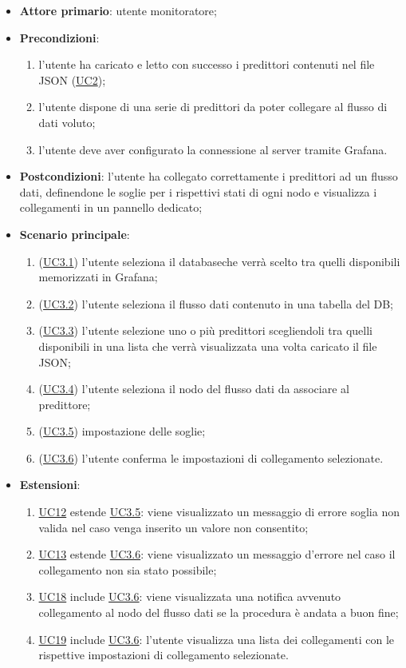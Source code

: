 		\begin{itemize}
			\item\textbf{Attore primario}: utente monitoratore;
			\item\textbf{Precondizioni}:
				\begin{enumerate}
					\item l’utente ha caricato e letto con successo i predittori contenuti nel file JSON (\hyperref[par:UC2]{UC2});
					\item l’utente dispone di una serie di predittori da poter collegare al flusso di dati voluto;
					\item l’utente deve aver configurato la connessione al server tramite Grafana.	
				\end{enumerate}
			\item\textbf{Postcondizioni}: l’utente ha collegato correttamente i predittori ad un flusso dati, definendone le soglie per i rispettivi stati di ogni nodo e visualizza i collegamenti in un pannello dedicato;
			\item\textbf{Scenario principale}:
				\begin{enumerate}
					\item (\hyperref[par:UC3.1]{UC3.1}) l’utente seleziona il database\glo che verrà scelto tra quelli disponibili memorizzati in Grafana;
					\item (\hyperref[par:UC3.2]{UC3.2}) l’utente seleziona il flusso dati contenuto in una tabella del DB;
					\item (\hyperref[par:UC3.3]{UC3.3}) l'utente selezione uno o più predittori scegliendoli tra quelli disponibili in una lista che verrà visualizzata una volta caricato il file JSON;
					\item (\hyperref[par:UC3.4]{UC3.4}) l'utente seleziona il nodo del flusso dati da associare al predittore;
					\item (\hyperref[par:UC3.5]{UC3.5}) impostazione delle soglie;
					\item (\hyperref[par:UC3.6]{UC3.6}) l'utente conferma le impostazioni di collegamento selezionate.	
				\end{enumerate}
			\item\textbf{Estensioni}:
				\begin{enumerate}
					\item\hyperref[par:UC12]{UC12} estende \hyperref[par:UC3.5]{UC3.5}: viene visualizzato un messaggio di errore soglia non valida nel caso venga inserito un valore non consentito;
					\item\hyperref[par:UC13]{UC13} estende \hyperref[par:UC3.6]{UC3.6}: viene visualizzato un messaggio d’errore nel caso il collegamento non sia stato possibile;
					\item\hyperref[par:UC18]{UC18} include \hyperref[par:UC3.6]{UC3.6}: viene visualizzata una notifica avvenuto collegamento al nodo del flusso dati se la procedura è andata a buon fine;
					\item\hyperref[par:UC19]{UC19} include \hyperref[par:UC3.6]{UC3.6}: l'utente visualizza una lista dei collegamenti con le rispettive impostazioni di collegamento selezionate.
				\end{enumerate}
		\end{itemize}
		
